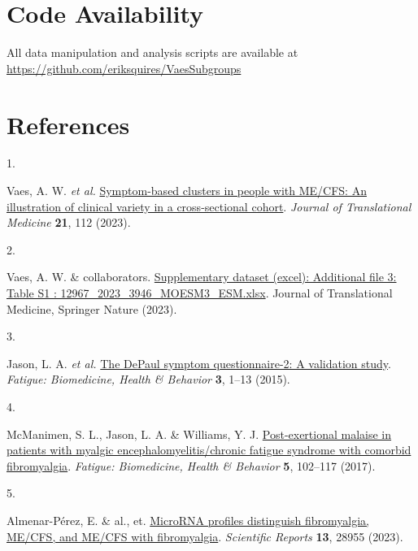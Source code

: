 \documentclass[
  letterpaper,
  DIV=11,
  numbers=noendperiod]{scrartcl}
\newlength{\cslhangindent}
\newlength{\csllabelwidth}
\newenvironment{CSLReferences}[2] %
 {\begin{list}{}{%
  \setlength{\itemindent}{0pt}
  \setlength{\leftmargin}{0pt}
  \setlength{\parsep}{0pt}
  \ifodd #1
   \setlength{\leftmargin}{\cslhangindent}
   \setlength{\itemindent}{-1\cslhangindent}
  \fi
  \setlength{\itemsep}{#2\baselineskip}}}
 {\end{list}}
\newcommand{\CSLLeftMargin}[1]{\parbox[t]{\csllabelwidth}{\strut#1\strut}}
\newcommand{\CSLRightInline}[1]{\parbox[t]{\linewidth - \csllabelwidth}{\strut#1\strut}}
\begin{document}
\FloatBarrier

\section*{Code Availability}\label{sec-code}

All data manipulation and analysis scripts are available at
\url{https://github.com/eriksquires/VaesSubgroups}

\newpage{}

\section*{References}\label{references}

\label{refs}
\begin{CSLReferences}{0}{0}
\CSLLeftMargin{1. }%
\CSLRightInline{Vaes, A. W. \emph{et al.}
\href{https://doi.org/10.1186/s12967-023-03946-6}{Symptom-based clusters
in people with ME/CFS: An illustration of clinical variety in a
cross-sectional cohort}. \emph{Journal of Translational Medicine}
\textbf{21}, 112 (2023).}

\CSLLeftMargin{2. }%
\CSLRightInline{Vaes, A. W. \& collaborators.
\href{https://static-content.springer.com/esm/art\%3A10.1186\%2Fs12967-023-03946-6/MediaObjects/12967_2023_3946_MOESM3_ESM.xlsx}{Supplementary
dataset (excel): Additional file 3: Table S1 :
12967\_2023\_3946\_MOESM3\_ESM.xlsx}. Journal of Translational Medicine,
Springer Nature (2023).}

\CSLLeftMargin{3. }%
\CSLRightInline{Jason, L. A. \emph{et al.}
\href{https://doi.org/10.1080/21641846.2014.978110}{The DePaul symptom
questionnaire-2: A validation study}. \emph{Fatigue: Biomedicine, Health
\& Behavior} \textbf{3}, 1--13 (2015).}

\CSLLeftMargin{4. }%
\CSLRightInline{McManimen, S. L., Jason, L. A. \& Williams, Y. J.
\href{https://doi.org/10.1080/21641846.2017.1281323}{Post-exertional
malaise in patients with myalgic encephalomyelitis/chronic fatigue
syndrome with comorbid fibromyalgia}. \emph{Fatigue: Biomedicine, Health
\& Behavior} \textbf{5}, 102--117 (2017).}

\CSLLeftMargin{5. }%
\CSLRightInline{Almenar-Pérez, E. \& al., et.
\href{https://doi.org/10.1038/s41598-023-28955-9}{MicroRNA profiles
distinguish fibromyalgia, ME/CFS, and ME/CFS with fibromyalgia}.
\emph{Scientific Reports} \textbf{13}, 28955 (2023).}

\end{CSLReferences}
\end{document}
